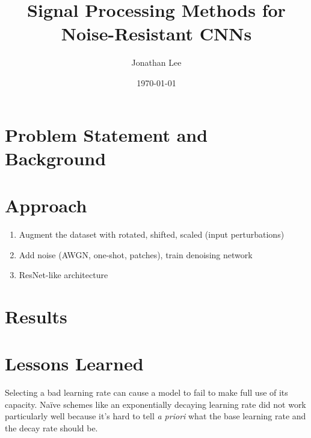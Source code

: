 \documentclass[justified]{article}
\begin{document}
  \title{Signal Processing Methods for Noise-Resistant CNNs}
  \author{Jonathan Lee}
  \date{\today}
  \maketitle

  \section{Problem Statement and Background}

  \section{Approach}

  \begin{enumerate}
  \item Augment the dataset with rotated, shifted, scaled (input perturbations)
  \item Add noise (AWGN, one-shot, patches), train denoising network
  \item ResNet-like architecture
  \end{enumerate}

  \section{Results}

  \section{}

  \section{Lessons Learned}

  Selecting a bad learning rate can cause a model to fail to make full use of its capacity.
  Na\"{i}ve schemes like an exponentially decaying learning rate did not work particularly well because it's hard to tell \textit{a priori} what the base learning rate and the decay rate should be.
\end{document}
